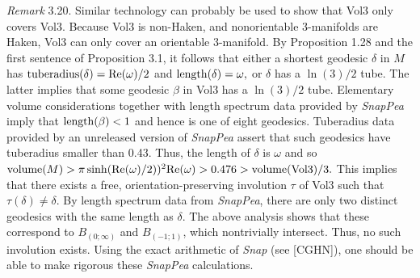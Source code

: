 {\it Remark} 3.20.  Similar technology can probably be used to show that Vol3 only covers Vol3.  Because Vol3 is
non-Haken, and nonorientable 3-manifolds are Haken, 
Vol3 can only cover an orientable 3-manifold.
By Proposition 1.28 and the first sentence of Proposition 3.1, it follows that either a shortest geodesic $\delta$ in $M$ has ${\rm tuberadius}(\delta) 
= {\rm Re}(\omega)/2$ and ${\rm length}(\delta) = \omega,$ or $\delta$ has a $\ln(3)/2$ tube.  The latter implies that some geodesic $\beta$ in Vol3 has a $\ln(3)/2$ tube.  Elementary volume considerations together with length spectrum data provided by {\it SnapPea} imply that ${\rm length}(\beta) < 1$ and hence is one of
eight geodesics.  Tuberadius data provided by an unreleased version of {\it SnapPea} assert that such geodesics
have  tuberadius smaller than 0.43.   Thus, the length of $\delta$ is $\omega$ and so 
${\rm volume}(M) > \pi \sinh({\rm Re}(\omega)/2))^2 {\rm Re}(\omega) > 
0.476 > {\rm volume}({\rm Vol3})/3.$  This implies that there exists a free, orientation-preserving involution $\tau$ of Vol3 such that $\tau(\delta) \ne \delta.$  By  length spectrum data from {\it SnapPea}, there are only two distinct geodesics with the same length as $\delta.$  The above analysis shows that these correspond to $ B_{(0;\infty)}$ and $ B_{(-1;1)}$, which nontrivially intersect.  Thus, no such involution exists.  Using the exact arithmetic of {\it Snap} (see [CGHN]), one should be able to make rigorous these {\it SnapPea} calculations.
 




